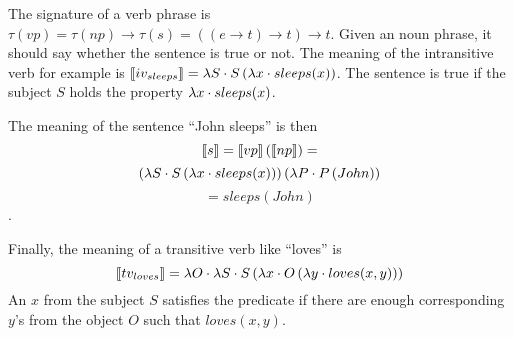 The signature of a verb phrase is $\tau(vp) = \tau(np) \rightarrow \tau(s) = ((e \rightarrow t) \rightarrow t) \rightarrow t$. Given an noun phrase, it should say whether the sentence is true or not. The meaning of the intransitive verb for example is $\llbracket iv_{sleeps} \rrbracket = \lambda S \cdot S \left( \lambda x \cdot sleeps(x) \right)$. The sentence is true if the subject $S$ holds the property $\lambda x \cdot sleeps(x)$.

The meaning of the sentence ``John sleeps'' is then $$\llbracket s \rrbracket = \llbracket vp \rrbracket \left( \llbracket np \rrbracket \right) =$$ $$ \left( \lambda S \cdot S \left( \lambda x \cdot sleeps(x) \right) \right) \left( \lambda P \cdot P \left( John \right) \right)$$ $$= sleeps(John)$$.

Finally, the meaning of a transitive verb like ``loves'' is $$\llbracket tv_{loves} \rrbracket = \lambda O \cdot \lambda S \cdot S \left( \lambda x \cdot O \left( \lambda y \cdot loves(x, y) \right) \right)$$ An $x$ from the subject $S$ satisfies the predicate if there are enough corresponding $y$'s from the object $O$ such that $loves(x, y)$.



